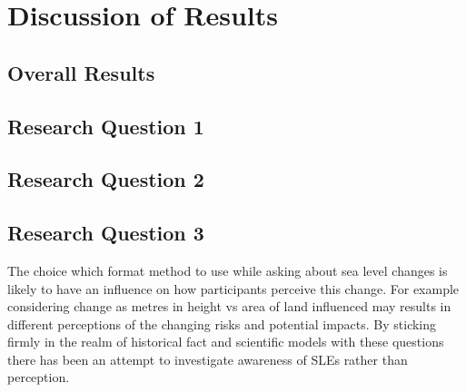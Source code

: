 
\chapter{Discussion of Results}

\section{Overall Results}

\section{Research Question 1}

\section{Research Question 2}


\section{Research Question 3}


The choice which format method to use while asking about sea level changes is likely to have an influence on how participants perceive this change. For example considering change as metres in height vs area of land influenced may results in different perceptions of the changing risks and potential impacts.  By sticking firmly in the realm of historical fact and scientific models with these questions there has been an attempt to investigate awareness of SLEs rather than perception. 


